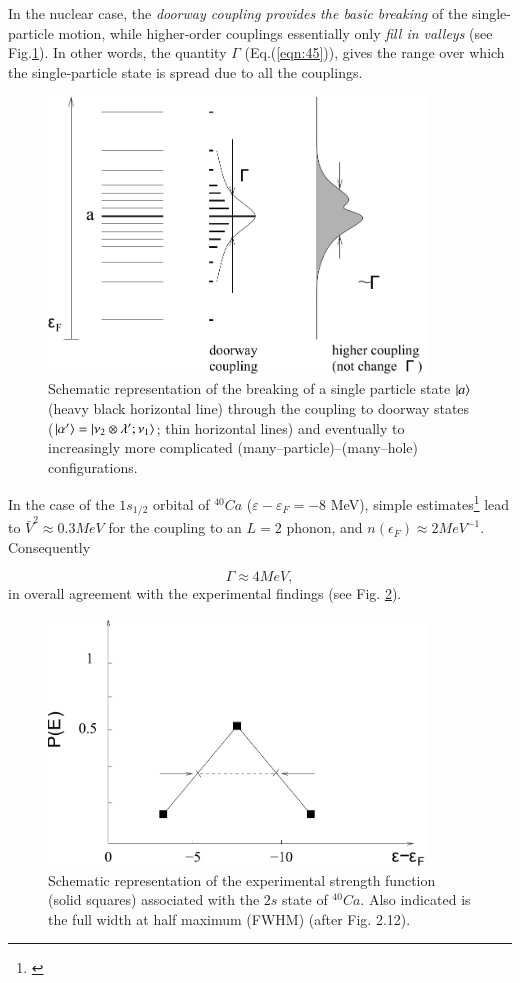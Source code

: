 In the nuclear case, the {\it doorway coupling provides the basic breaking} of the single-particle motion, while higher-order couplings essentially only {\it fill in valleys} (see Fig.\ref{fig:4.7}).
In other words, the quantity $\Gamma$ (Eq.(\ref{eqn:45})), gives the range over which the single-particle state is spread due to all the couplings.

\begin{figure}
\centerline {
\includegraphics*[width=10cm]{introduccion/figs/figintroD7}
}
\caption{Schematic representation of the breaking of a single particle state $|{a} \rangle$ (heavy black horizontal line) through the coupling to doorway states ($|{\alpha'} \rangle=|{\nu_2\otimes\lambda';\nu_1} \rangle$; thin horizontal lines) and eventually to increasingly more complicated (many--particle)--(many--hole) configurations.}
\label{fig:4.7}
\end{figure}

In the case of the $1s_{1/2}$ orbital of $^{40}Ca$ ($\varepsilon - \varepsilon_F = -8$ MeV), simple estimates\footnote{\cite{Mahaux:85}} lead to $\bar{V}^2 \approx 0.3 MeV$ for the coupling to an $L=2$ phonon, and $n(\epsilon_F) \approx 2MeV^{-1}$. Consequently

\begin{equation}
\Gamma \approx 4 MeV ,
\label{eqn:46}
\end{equation}
in overall agreement with the experimental findings (see Fig. \ref{fig:4.8}).
\begin{figure}[h!]
\centerline {
\includegraphics*[width=10cm]{introduccion/figs/figintroD8}
}
\caption{Schematic representation of the experimental strength function (solid squares) associated with the $2s$ state of $^{40}Ca$. Also indicated is the full width at half maximum (FWHM) (after \cite{Mahaux:85} Fig. 2.12).}
\label{fig:4.8}
\end{figure}

